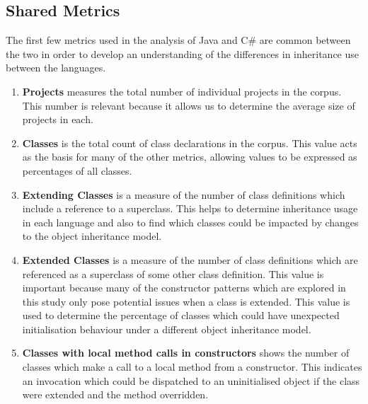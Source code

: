 \subsection{Shared Metrics}
The first few metrics used in the analysis of Java and C\# are common between the two in order to develop an understanding of the differences in inheritance use between the languages.
\begin{enumerate}
	\item \textbf{Projects} measures the total number of individual projects in the corpus. This number is relevant because it allows us to determine the average size of projects in each.
	\item \textbf{Classes} is the total count of class declarations in the corpus. This value acts as the basis for many of the other metrics, allowing values to be expressed as percentages of all classes.
	\item \textbf{Extending Classes} is a measure of the number of class definitions which include a reference to a superclass. This helps to determine inheritance usage in each language and also to find which classes could be impacted by changes to the object inheritance model.
	\item \textbf{Extended Classes} is a measure of the number of class definitions which are referenced as a superclass of some other class definition. This value is important because many of the constructor patterns which are explored in this study only pose potential issues when a class is extended. This value is used to determine the percentage of classes which could have unexpected initialisation behaviour under a different object inheritance model.
	
	\item \textbf{Classes with local method calls in constructors} shows the number of classes which make a call to a local method from a constructor. This indicates an invocation which could be dispatched to an uninitialised object if the class were extended and the method overridden.
\end{enumerate}

